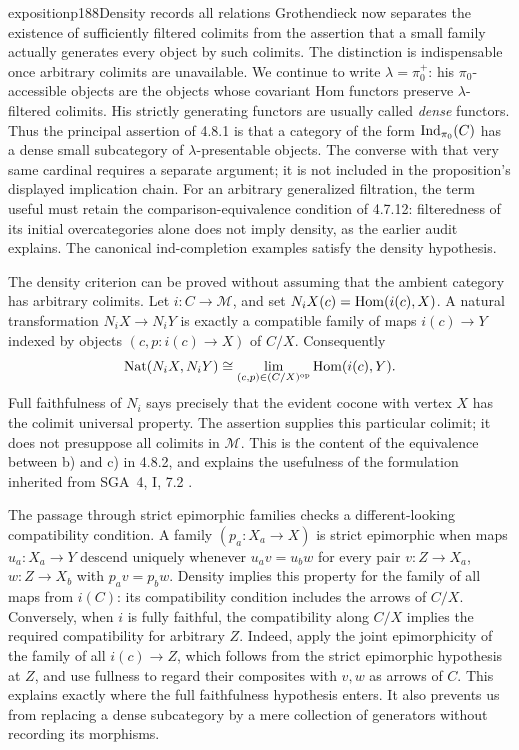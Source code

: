 
\begin{dcomment}{exposition}{p188}{Density records all relations}
Grothendieck now separates the existence of sufficiently filtered colimits from the assertion that a small family actually generates every object by such colimits. The distinction is indispensable once arbitrary colimits are unavailable. We continue to write $\lambda=\pi_0^+$: his $\pi_0$-accessible objects are the objects whose covariant Hom functors preserve $\lambda$-filtered colimits. His strictly generating functors are usually called \emph{dense} functors. Thus the principal assertion of 4.8.1 is that a category of the form $\operatorname{Ind}_{\pi_0}(C)$ has a dense small subcategory of $\lambda$-presentable objects. The converse with that very same cardinal requires a separate argument; it is not included in the proposition's displayed implication chain. For an arbitrary generalized filtration, the term useful must retain the comparison-equivalence condition of 4.7.12: filteredness of its initial overcategories alone does not imply density, as the earlier audit explains. The canonical ind-completion examples satisfy the density hypothesis.

The density criterion can be proved without assuming that the ambient category has arbitrary colimits. Let $i:C\to\mathcal M$, and set $N_iX(c)=\operatorname{Hom}(i(c),X)$. A natural transformation $N_iX\to N_iY$ is exactly a compatible family of maps $i(c)\to Y$ indexed by objects $(c,p:i(c)\to X)$ of $C/X$. Consequently
\[
 \operatorname{Nat}(N_iX,N_iY)
 \cong \lim_{(c,p)\in(C/X)^{\mathrm{op}}}\operatorname{Hom}(i(c),Y).
\]
Full faithfulness of $N_i$ says precisely that the evident cocone with vertex $X$ has the colimit universal property. The assertion supplies this particular colimit; it does not presuppose all colimits in $\mathcal M$. This is the content of the equivalence between b) and c) in 4.8.2, and explains the usefulness of the formulation inherited from SGA~4, I, 7.2 \citep{SGA4I1972}.

The passage through strict epimorphic families checks a different-looking compatibility condition. A family $(p_a:X_a\to X)$ is strict epimorphic when maps $u_a:X_a\to Y$ descend uniquely whenever $u_av=u_bw$ for every pair $v:Z\to X_a$, $w:Z\to X_b$ with $p_av=p_bw$. Density implies this property for the family of all maps from $i(C)$: its compatibility condition includes the arrows of $C/X$. Conversely, when $i$ is fully faithful, the compatibility along $C/X$ implies the required compatibility for arbitrary $Z$. Indeed, apply the joint epimorphicity of the family of all $i(c)\to Z$, which follows from the strict epimorphic hypothesis at $Z$, and use fullness to regard their composites with $v,w$ as arrows of $C$. This explains exactly where the full faithfulness hypothesis enters. It also prevents us from replacing a dense subcategory by a mere collection of generators without recording its morphisms.
\end{dcomment}


